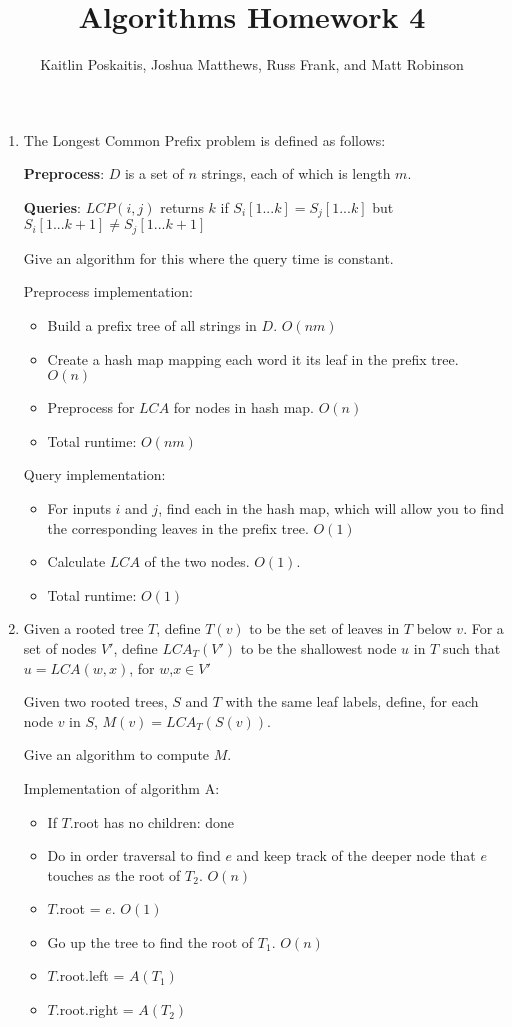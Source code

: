 \documentclass[12pt]{article}
\title{\bf Algorithms Homework 4}
\author{Kaitlin Poskaitis, Joshua Matthews, Russ Frank, and Matt Robinson}
\date{}
\begin{document}
\maketitle

\begin{enumerate}
\item The Longest Common Prefix problem is defined as follows:

    {\bf Preprocess}: $D$ is a set of $n$ strings, each of which is
        length $m$.

    {\bf Queries}: $LCP(i,j)$ returns $k$ if $S_i[1...k] = S_j[1...k]$
        but $S_i[1...k+1] \neq S_j[1...k+1]$

Give an algorithm for this where the query time is constant.

Preprocess implementation:
\begin{itemize}
    \item Build a prefix tree of all strings in $D$. $O(nm)$
    \item Create a hash map mapping each word it its leaf in the prefix tree.
        $O(n)$
    \item Preprocess for $LCA$ for nodes in hash map. $O(n)$
    \item Total runtime: $O(nm)$
\end{itemize}

Query implementation:
\begin{itemize}
    \item For inputs $i$ and $j$, find each in the hash map, which will allow
        you to find the corresponding leaves in the prefix tree. $O(1)$
    \item Calculate $LCA$ of the two nodes. $O(1)$.
    \item Total runtime: $O(1)$
\end{itemize}

\item Given a rooted tree $T$, define $T(v)$ to be the set of leaves in $T$
    below $v$. For a set of nodes $V'$, define $LCA_T(V')$ to be the shallowest
    node $u$ in $T$ such that $u = LCA(w,x)$, for $w$,$x \in V'$

    Given two rooted trees, $S$ and $T$ with the same leaf labels, define, for
    each node $v$ in $S$, $M(v) = LCA_T(S(v))$.

    Give an algorithm to compute $M$.

    Implementation of algorithm A:
    \begin{itemize}
        \item If $T$.root has no children: done
        \item Do in order traversal to find $e$ and keep track of the deeper
            node that $e$ touches as the root of $T_2$. $O(n)$
        \item $T$.root = $e$. $O(1)$
        \item Go up the tree to find the root of $T_1$. $O(n)$
        \item $T$.root.left = $A(T_1)$
        \item $T$.root.right = $A(T_2)$
    \end{itemize}


\end{enumerate}
\end{document}
